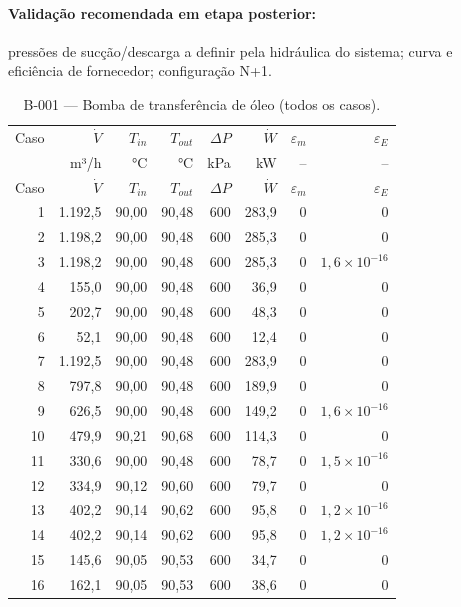 \documentclass[11pt,a4paper]{article}
\numberwithin{equation}{section}
\numberwithin{table}{section}
\numberwithin{figure}{section}
\begin{document}
\paragraph{Validação recomendada em etapa posterior:} pressões de sucção/descarga a definir pela hidráulica do sistema; curva e eficiência de fornecedor; configuração N+1.
{\footnotesize\setlength{\tabcolsep}{3.5pt}\begin{longtable}{rrrrrrrr}
\caption{B-001 --- Bomba de transferência de óleo (todos os casos).\label{tab:b001}}\\\toprule
Caso & $\dot V$ & $T_{in}$ & $T_{out}$ & $\Delta P$ & $\dot W$ & $\varepsilon_m$ & $\varepsilon_E$\\
 & m³/h & °C & °C & kPa & kW & -- & --\\\midrule\endfirsthead
\toprule Caso & $\dot V$ & $T_{in}$ & $T_{out}$ & $\Delta P$ & $\dot W$ & $\varepsilon_m$ & $\varepsilon_E$\\\midrule\endhead
1 & 1.192,5 & 90,00 & 90,48 & 600 & 283,9 & $0$ & $0$\\
2 & 1.198,2 & 90,00 & 90,48 & 600 & 285,3 & $0$ & $0$\\
3 & 1.198,2 & 90,00 & 90,48 & 600 & 285,3 & $0$ & $1{,}6\times10^{-16}$\\
4 & 155,0 & 90,00 & 90,48 & 600 & 36,9 & $0$ & $0$\\
5 & 202,7 & 90,00 & 90,48 & 600 & 48,3 & $0$ & $0$\\
6 & 52,1 & 90,00 & 90,48 & 600 & 12,4 & $0$ & $0$\\
7 & 1.192,5 & 90,00 & 90,48 & 600 & 283,9 & $0$ & $0$\\
8 & 797,8 & 90,00 & 90,48 & 600 & 189,9 & $0$ & $0$\\
9 & 626,5 & 90,00 & 90,48 & 600 & 149,2 & $0$ & $1{,}6\times10^{-16}$\\
10 & 479,9 & 90,21 & 90,68 & 600 & 114,3 & $0$ & $0$\\
11 & 330,6 & 90,00 & 90,48 & 600 & 78,7 & $0$ & $1{,}5\times10^{-16}$\\
12 & 334,9 & 90,12 & 90,60 & 600 & 79,7 & $0$ & $0$\\
13 & 402,2 & 90,14 & 90,62 & 600 & 95,8 & $0$ & $1{,}2\times10^{-16}$\\
14 & 402,2 & 90,14 & 90,62 & 600 & 95,8 & $0$ & $1{,}2\times10^{-16}$\\
15 & 145,6 & 90,05 & 90,53 & 600 & 34,7 & $0$ & $0$\\
16 & 162,1 & 90,05 & 90,53 & 600 & 38,6 & $0$ & $0$\\
\bottomrule\end{longtable}}
\end{document}
